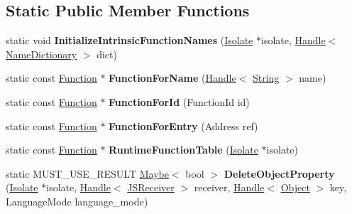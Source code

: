 \subsection*{Static Public Member Functions}
\begin{DoxyCompactItemize}
\item 
static void {\bfseries Initialize\+Intrinsic\+Function\+Names} (\hyperlink{classv8_1_1internal_1_1_isolate}{Isolate} $\ast$isolate, \hyperlink{classv8_1_1internal_1_1_handle}{Handle}$<$ \hyperlink{classv8_1_1internal_1_1_name_dictionary}{Name\+Dictionary} $>$ dict)\hypertarget{classv8_1_1internal_1_1_runtime_a2af56c161b8cb654eaa8ef8f86e4ba5c}{}\label{classv8_1_1internal_1_1_runtime_a2af56c161b8cb654eaa8ef8f86e4ba5c}

\item 
static const \hyperlink{structv8_1_1internal_1_1_runtime_1_1_function}{Function} $\ast$ {\bfseries Function\+For\+Name} (\hyperlink{classv8_1_1internal_1_1_handle}{Handle}$<$ \hyperlink{classv8_1_1internal_1_1_string}{String} $>$ name)\hypertarget{classv8_1_1internal_1_1_runtime_aea6fd7c87dbfcbb2aa24d9b59214d557}{}\label{classv8_1_1internal_1_1_runtime_aea6fd7c87dbfcbb2aa24d9b59214d557}

\item 
static const \hyperlink{structv8_1_1internal_1_1_runtime_1_1_function}{Function} $\ast$ {\bfseries Function\+For\+Id} (Function\+Id id)\hypertarget{classv8_1_1internal_1_1_runtime_a1fb4256645450f73e9ee39d4f38f3d58}{}\label{classv8_1_1internal_1_1_runtime_a1fb4256645450f73e9ee39d4f38f3d58}

\item 
static const \hyperlink{structv8_1_1internal_1_1_runtime_1_1_function}{Function} $\ast$ {\bfseries Function\+For\+Entry} (Address ref)\hypertarget{classv8_1_1internal_1_1_runtime_a82e21040bb88fd62e811b273d9592b62}{}\label{classv8_1_1internal_1_1_runtime_a82e21040bb88fd62e811b273d9592b62}

\item 
static const \hyperlink{structv8_1_1internal_1_1_runtime_1_1_function}{Function} $\ast$ {\bfseries Runtime\+Function\+Table} (\hyperlink{classv8_1_1internal_1_1_isolate}{Isolate} $\ast$isolate)\hypertarget{classv8_1_1internal_1_1_runtime_a0992be0188c64085327b7dfbadb43b5b}{}\label{classv8_1_1internal_1_1_runtime_a0992be0188c64085327b7dfbadb43b5b}

\item 
static M\+U\+S\+T\+\_\+\+U\+S\+E\+\_\+\+R\+E\+S\+U\+LT \hyperlink{classv8_1_1_maybe}{Maybe}$<$ bool $>$ {\bfseries Delete\+Object\+Property} (\hyperlink{classv8_1_1internal_1_1_isolate}{Isolate} $\ast$isolate, \hyperlink{classv8_1_1internal_1_1_handle}{Handle}$<$ \hyperlink{classv8_1_1internal_1_1_j_s_receiver}{J\+S\+Receiver} $>$ receiver, \hyperlink{classv8_1_1internal_1_1_handle}{Handle}$<$ \hyperlink{classv8_1_1internal_1_1_object}{Object} $>$ key, Language\+Mode language\+\_\+mode)\hypertarget{classv8_1_1internal_1_1_runtime_a10d124df53f096f5ae5190f8bfa23c33}{}\label{classv8_1_1internal_1_1_runtime_a10d124df53f096f5ae5190f8bfa23c33}


\end{DoxyCompactItemize}
